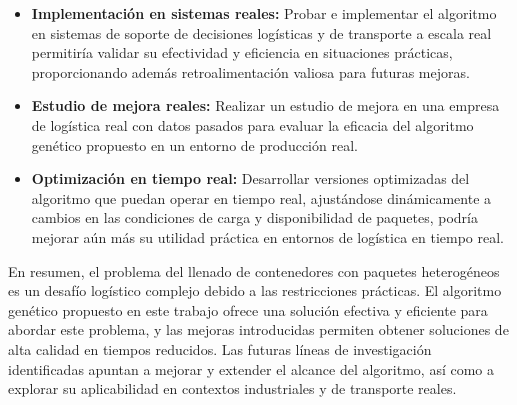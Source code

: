 \begin{itemize}
    \item \textbf{Implementación en sistemas reales:} Probar e implementar el algoritmo en sistemas de soporte de decisiones logísticas y de transporte a escala real permitiría validar su efectividad y eficiencia en situaciones prácticas, proporcionando además retroalimentación valiosa para futuras mejoras.
    \item \textbf{Estudio de mejora reales:} Realizar un estudio de mejora en una empresa de logística real con datos pasados para evaluar la eficacia del algoritmo genético propuesto en un entorno de producción real.

    \item \textbf{Optimización en tiempo real:} Desarrollar versiones optimizadas del algoritmo que puedan operar en tiempo real, ajustándose dinámicamente a cambios en las condiciones de carga y disponibilidad de paquetes, podría mejorar aún más su utilidad práctica en entornos de logística en tiempo real.
\end{itemize}

En resumen, el problema del llenado de contenedores con paquetes heterogéneos es un desafío logístico complejo debido a las restricciones prácticas. El algoritmo genético propuesto en este trabajo ofrece una solución efectiva y eficiente para abordar este problema, y las mejoras introducidas permiten obtener soluciones de alta calidad en tiempos reducidos. Las futuras líneas de investigación identificadas apuntan a mejorar y extender el alcance del algoritmo, así como a explorar su aplicabilidad en contextos industriales y de transporte reales.